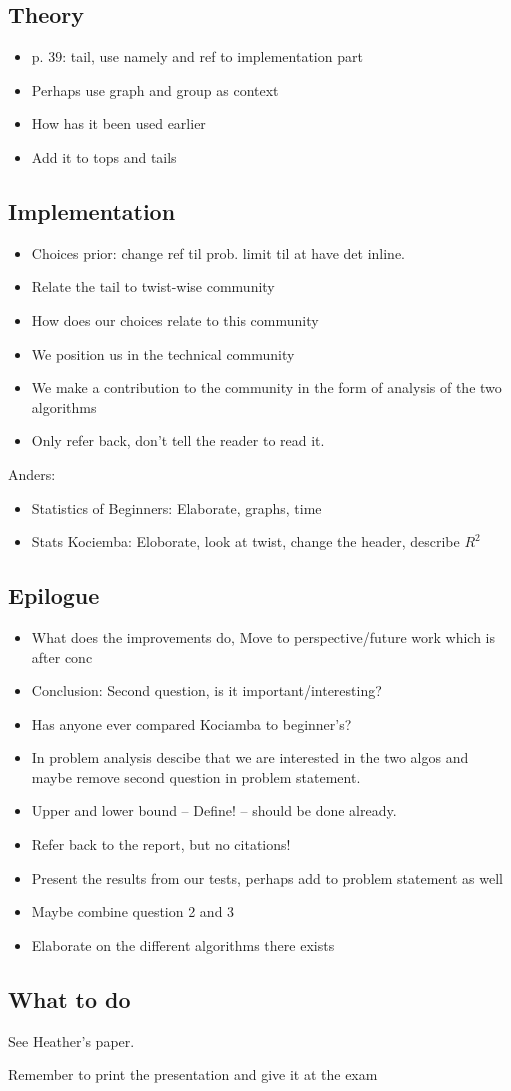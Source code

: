 \subsection{Theory}
\begin{itemize}
	\item p. 39: tail, use namely and ref to implementation part
	\item Perhaps use graph and group as context
	\item How has it been used earlier
	\item Add it to tops and tails
\end{itemize}

\subsection{Implementation}
\begin{itemize}
	\item Choices prior: change ref til prob. limit til at have det inline.
	\item Relate the tail to twist-wise community
	\item How does our choices relate to this community
	\item We position us in the technical community
	\item We make a contribution to the community in the form of analysis of the two algorithms
	\item Only refer back, don't tell the reader to read it.
\end{itemize}

Anders:
\begin{itemize}
	\item Statistics of Beginners: Elaborate, graphs, time
	\item Stats Kociemba: Eloborate, look at twist, change the header, describe $R^2$
\end{itemize}

\subsection{Epilogue}
\begin{itemize}
	\item What does the improvements do, Move to perspective/future work which is after conc
	\item Conclusion: Second question, is it important/interesting?
	\item Has anyone ever compared Kociamba to beginner's?
	\item In problem analysis descibe that we are interested in the two algos and maybe remove second question in problem statement.
	\item Upper and lower bound -- Define! -- should be done already.
	\item Refer back to the report, but no citations!
	\item Present the results from our tests, perhaps add to problem statement as well
	\item Maybe combine question 2 and 3
	\item Elaborate on the different algorithms there exists
\end{itemize}

\subsection{What to do}
See Heather's paper.


Remember to print the presentation and give it at the exam

